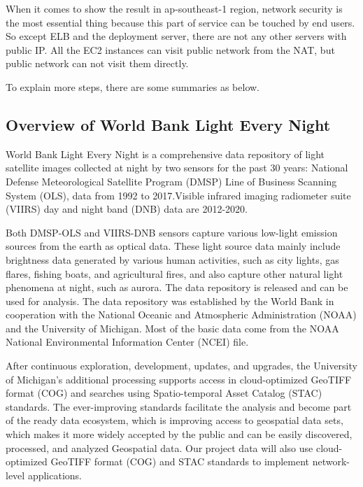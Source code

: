 \documentclass[conference]{IEEEtran}
\begin{document}
When it comes to show the result in ap-southeast-1 region, network security is the most essential thing because this part of service can be touched by end users. 
So except ELB and the deployment server, there are not any other servers with public IP. All the EC2 instances can visit public network from the NAT, but public network 
can not visit them directly.

To explain more steps, there are some summaries as below. 

\subsection{Overview of World Bank Light Every Night}
World Bank Light Every Night \cite{WorldBan13:online} is a comprehensive data repository of light satellite images collected at night by 
two sensors for the past 30 years: National Defense Meteorological Satellite Program (DMSP) Line of Business Scanning 
System (OLS), data from 1992 to 2017.Visible infrared imaging radiometer suite (VIIRS) day and night band (DNB) data are 2012-2020. 
    
Both DMSP-OLS and VIIRS-DNB sensors capture various low-light emission sources from the earth as optical data. These light source 
data mainly include brightness data generated by various human activities, such as city lights, gas flares, fishing boats, and 
agricultural fires, and also capture other natural light phenomena at night, such as aurora. The data repository is released and 
can be used for analysis. The data repository was established by the World Bank in cooperation with the National Oceanic and Atmospheric 
Administration (NOAA) and the University of Michigan. Most of the basic data come from the NOAA National Environmental Information 
Center (NCEI) file.
    
After continuous exploration, development, updates, and upgrades, the University of Michigan’s additional processing supports access 
in cloud-optimized GeoTIFF format (COG) and searches using Spatio-temporal Asset Catalog (STAC) standards. The ever-improving standards 
facilitate the analysis and become part of the ready data ecosystem, which is improving access to geospatial data sets, which makes it 
more widely accepted by the public and can be easily discovered, processed, and analyzed Geospatial data. Our project data will also use 
cloud-optimized GeoTIFF format (COG) and STAC standards to implement network-level applications.
\end{document}
